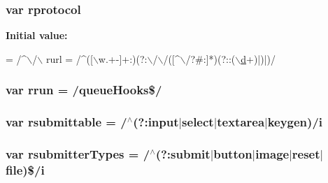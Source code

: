 \hypertarget{jquery-1_89_81_8js_a0f02b710647fcf95e74593954fb9b4cb}{
\subsubsection[{rprotocol}]{\setlength{\rightskip}{0pt plus 5cm}var rprotocol}}\label{jquery-1_89_81_8js_a0f02b710647fcf95e74593954fb9b4cb}
{\bfseries Initial value\+:}
\begin{DoxyCode}
= /^\(\backslash\)/\(\backslash\)
    rurl = /^([\(\backslash\)w.+-]+:)(?:\(\backslash\)/\(\backslash\)/([^\(\backslash\)/?#:]*)(?::(\hyperlink{jquery-ui-tabs_8js_a36541169dfff685f807208881a4f0021}{\(\backslash\)d}+)|)|)/
\end{DoxyCode}
\hypertarget{jquery-1_89_81_8js_acf9d5e6b315eca81eb432bb6ee280a2e}{
\subsubsection[{rrun}]{\setlength{\rightskip}{0pt plus 5cm}var rrun = /queue\+Hooks\$/}}\label{jquery-1_89_81_8js_acf9d5e6b315eca81eb432bb6ee280a2e}
\hypertarget{jquery-1_89_81_8js_a12d248d7e6c5985c5ea21f56fbef9e90}{
\subsubsection[{rsubmittable}]{\setlength{\rightskip}{0pt plus 5cm}var rsubmittable = /$^\wedge$(?\+:{\bf input}$\vert${\bf select}$\vert${\bf textarea}$\vert$keygen)/{\bf i}}}\label{jquery-1_89_81_8js_a12d248d7e6c5985c5ea21f56fbef9e90}
\hypertarget{jquery-1_89_81_8js_a0e9cd4ca08945afe827846f34a36c74a}{
\subsubsection[{rsubmitter\+Types}]{\setlength{\rightskip}{0pt plus 5cm}var rsubmitter\+Types = /$^\wedge$(?\+:submit$\vert$button$\vert$image$\vert${\bf reset}$\vert$file)\$/{\bf i}}}\label{jquery-1_89_81_8js_a0e9cd4ca08945afe827846f34a36c74a}
